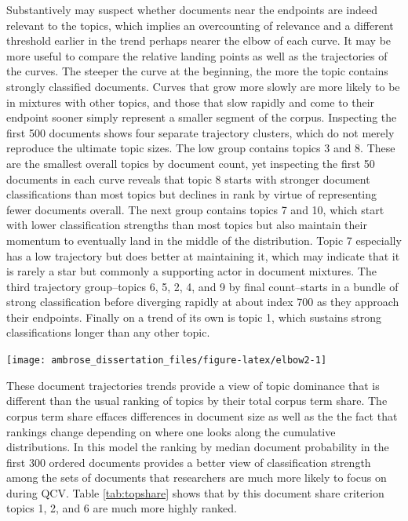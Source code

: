 \documentclass[]{book}
\theoremstyle{definition}
\theoremstyle{definition}
\theoremstyle{definition}
\theoremstyle{remark}
\begin{document}
Substantively may suspect whether documents near the endpoints are
indeed relevant to the topics, which implies an overcounting of
relevance and a different threshold earlier in the trend perhaps nearer
the elbow of each curve. It may be more useful to compare the relative
landing points as well as the trajectories of the curves. The steeper
the curve at the beginning, the more the topic contains strongly
classified documents. Curves that grow more slowly are more likely to be
in mixtures with other topics, and those that slow rapidly and come to
their endpoint sooner simply represent a smaller segment of the corpus.
Inspecting the first 500 documents shows four separate trajectory
clusters, which do not merely reproduce the ultimate topic sizes. The
low group contains topics 3 and 8. These are the smallest overall topics
by document count, yet inspecting the first 50 documents in each curve
reveals that topic 8 starts with stronger document classifications than
most topics but declines in rank by virtue of representing fewer
documents overall. The next group contains topics 7 and 10, which start
with lower classification strengths than most topics but also maintain
their momentum to eventually land in the middle of the distribution.
Topic 7 especially has a low trajectory but does better at maintaining
it, which may indicate that it is rarely a star but commonly a
supporting actor in document mixtures. The third trajectory
group--topics 6, 5, 2, 4, and 9 by final count--starts in a bundle of
strong classification before diverging rapidly at about index 700 as
they approach their endpoints. Finally on a trend of its own is topic 1,
which sustains strong classifications longer than any other topic.

\begin{center}\texttt{[image: ambrose\_dissertation\_files/figure-latex/elbow2-1]} \end{center}

These document trajectories trends provide a view of topic dominance
that is different than the usual ranking of topics by their total corpus
term share. The corpus term share effaces differences in document size
as well as the the fact that rankings change depending on where one
looks along the cumulative distributions. In this model the ranking by
median document probability in the first 300 ordered documents provides
a better view of classification strength among the sets of documents
that researchers are much more likely to focus on during QCV. Table
\ref{tab:topshare} shows that by this document share criterion topics 1,
2, and 6 are much more highly ranked.
\end{document}
